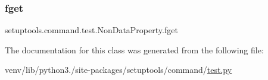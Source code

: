 \subsubsection{\texorpdfstring{fget}{fget}}
{\footnotesize\ttfamily setuptools.\+command.\+test.\+Non\+Data\+Property.\+fget}



The documentation for this class was generated from the following file\+:\begin{DoxyCompactItemize}
\item 
venv/lib/python3./site-\/packages/setuptools/command/\hyperlink{venv_2lib_2python3_89_2site-packages_2setuptools_2command_2test_8py}{test.\+py}\end{DoxyCompactItemize}
